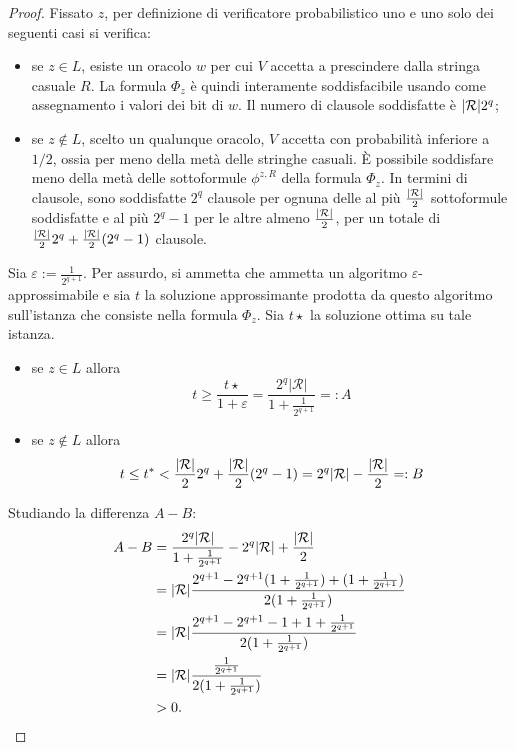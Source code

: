 \begin{proof}
	Fissato $z$, per definizione di verificatore probabilistico uno e uno solo dei seguenti casi si verifica:
	\begin{itemize}
		\item se $z\in L$, esiste un oracolo $w$ per cui $V$ accetta a prescindere dalla stringa casuale $R$. La formula $\Phi_z$ è quindi interamente soddisfacibile usando come assegnamento i valori dei bit di $w$. Il numero di clausole soddisfatte è $| \mathcal R | 2^q$;
		\item se $z\notin L$, scelto un qualunque oracolo, $V$ accetta con probabilità inferiore a $1/2$, ossia per meno della metà delle stringhe casuali. È possibile soddisfare meno della metà delle sottoformule $\phi^{z,R}$ della formula $\Phi_z$. In termini di clausole, sono soddisfatte $2^q$ clausole per ognuna delle al più $\frac{| \mathcal R |}{2}$ sottoformule soddisfatte e al più $2^q-1$ per le altre almeno $\frac{| \mathcal R |}{2}$, per un totale di $\frac{| \mathcal R |}{2}2^q+\frac{| \mathcal R |}{2}(2^q-1)$ clausole.
	\end{itemize}

	Sia $\varepsilon:=\frac{1}{2^{q+1}}$.
	Per assurdo, si ammetta che \MaxSat ammetta un algoritmo $\varepsilon$-approssimabile e sia $t$ la soluzione approssimante prodotta da questo algoritmo sull'istanza che consiste nella formula $\Phi_z$.
	Sia $t\star$ la soluzione ottima su tale istanza.
	\begin{itemize}
		\item se $z\in L$ allora
		      \begin{equation*}
			      t \geq \frac{t\star}{1+\varepsilon} = \frac{2^q |\mathcal{R}|}{1+\frac{1}{2^{q+1}}} =: A
		      \end{equation*}
		\item se $z\notin L$ allora
		      \begin{equation*}
			      t \leq t^* < \frac{| \mathcal R |}{2}2^q+\frac{| \mathcal R |}{2}(2^q-1) = 2^q| \mathcal R |-\frac{| \mathcal R |}{2} =: B
		      \end{equation*}
	\end{itemize}
	Studiando la differenza $A-B$:
	\begin{align*}
		A-B & = \frac{2^q| \mathcal R |}{1+\frac{1}{2^{q+1}}} - 2^q| \mathcal R |+\frac{| \mathcal R |}{2}                           \\
		    & = | \mathcal R | \frac{2^{q+1} - 2^{q+1}(1+\frac{1}{2^{q+1}}) + (1+\frac{1}{2^{q+1}})}{2(1+\frac{1}{2^{q+1}})} \\
		    & = | \mathcal R | \frac{2^{q+1} - 2^{q+1}-1 + 1+\frac{1}{2^{q+1}}}{2(1+\frac{1}{2^{q+1}})}                      \\
		    & = | \mathcal R | \frac{\frac{1}{2^{q+1}}}{2(1 + \frac{1}{2^{q+1}})}                                            \\
		    & > 0 \text.
	\end{align*}


\end{proof}
